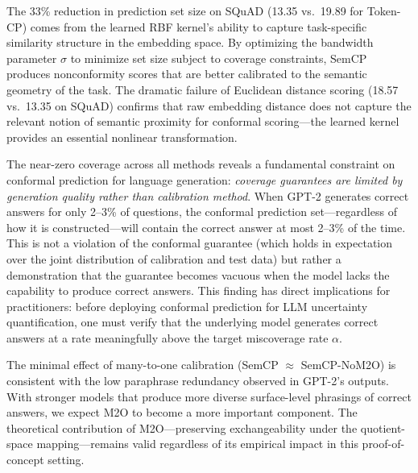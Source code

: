\documentclass{article}
\begin{document}
The 33\% reduction in prediction set size on SQuAD (13.35 vs.\ 19.89 for Token-CP) comes from the learned RBF kernel's ability to capture task-specific similarity structure in the embedding space. By optimizing the bandwidth parameter $\sigma$ to minimize set size subject to coverage constraints, SemCP produces nonconformity scores that are better calibrated to the semantic geometry of the task. The dramatic failure of Euclidean distance scoring (18.57 vs.\ 13.35 on SQuAD) confirms that raw embedding distance does not capture the relevant notion of semantic proximity for conformal scoring---the learned kernel provides an essential nonlinear transformation.

The near-zero coverage across all methods reveals a fundamental constraint on conformal prediction for language generation: \emph{coverage guarantees are limited by generation quality rather than calibration method}. When GPT-2 generates correct answers for only 2--3\% of questions, the conformal prediction set---regardless of how it is constructed---will contain the correct answer at most 2--3\% of the time. This is not a violation of the conformal guarantee (which holds in expectation over the joint distribution of calibration and test data) but rather a demonstration that the guarantee becomes vacuous when the model lacks the capability to produce correct answers. This finding has direct implications for practitioners: before deploying conformal prediction for LLM uncertainty quantification, one must verify that the underlying model generates correct answers at a rate meaningfully above the target miscoverage rate $\alpha$.

The minimal effect of many-to-one calibration (SemCP $\approx$ SemCP-NoM2O) is consistent with the low paraphrase redundancy observed in GPT-2's outputs. With stronger models that produce more diverse surface-level phrasings of correct answers, we expect M2O to become a more important component. The theoretical contribution of M2O---preserving exchangeability under the quotient-space mapping---remains valid regardless of its empirical impact in this proof-of-concept setting.
\end{document}
